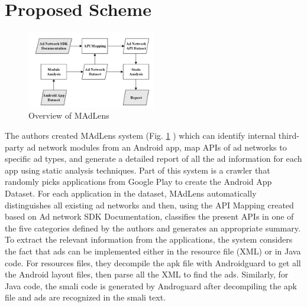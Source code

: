 \documentclass[conference]{IEEEtran}
\begin{document}
\section{Proposed Scheme}
\label{SectionFour}
\begin{figure}[htbp]
	\includegraphics[width=0.5\textwidth,height=0.5\textheight,keepaspectratio]{system.png}
	\caption{Overview of MAdLens}
	\label{fig:system}
\end{figure}
The authors created MAdLens system (Fig. \ref{fig:system} ) which can identify internal third-party ad network modules from an Android app, map APIs of ad networks to specific ad types, and generate a detailed report of all the ad information for each app using static analysis techniques. Part of this system is a crawler that randomly picks applications from Google Play to create the Android App Dataset. For each application in the dataset, MAdLens automatically distinguishes all existing ad networks and then, using the API Mapping created based on Ad network SDK Documentation, classifies the present APIs in one of the five categories defined by the authors and generates an appropriate summary. To extract the relevant information from the applications, the system considers the fact that ads can be implemented either in the resource file (XML) or in Java code. For resources files, they decompile the apk file with Androidguard to get all the Android layout files, then parse all the XML to find the ads. Similarly, for Java code, the smali code is generated by Androguard after decompiling the apk file and ads are recognized in the smali text.
\end{document}
